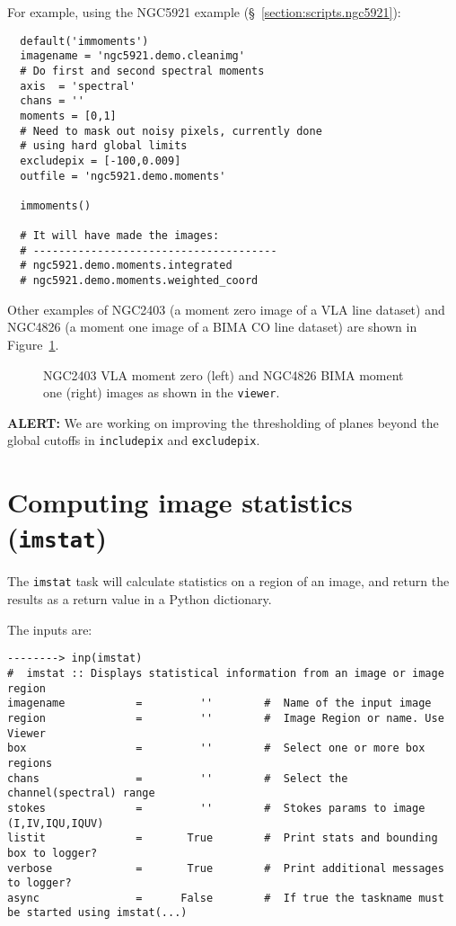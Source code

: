 For example, using the NGC5921 example (\S~\ref{section:scripts.ngc5921}):
\small
\begin{verbatim}
  default('immoments')
  imagename = 'ngc5921.demo.cleanimg'
  # Do first and second spectral moments
  axis  = 'spectral'
  chans = ''
  moments = [0,1]
  # Need to mask out noisy pixels, currently done
  # using hard global limits
  excludepix = [-100,0.009]
  outfile = 'ngc5921.demo.moments'
  
  immoments()
  
  # It will have made the images:
  # --------------------------------------
  # ngc5921.demo.moments.integrated
  # ngc5921.demo.moments.weighted_coord
\end{verbatim}
\normalsize

Other examples of NGC2403 (a moment zero image of a VLA line dataset)
and NGC4826 (a moment one image of a BIMA CO line dataset) are
shown in Figure~\ref{fig:n2403momzero}.

\begin{figure}[h!]
\begin{center}
\caption{\label{fig:n2403momzero} NGC2403 VLA moment zero (left) and
NGC4826 BIMA moment one (right) images as shown in the {\tt viewer}.}
\hrulefill
\end{center}
\end{figure}

{\bf ALERT:} We are working on improving the thresholding
of planes beyond the global cutoffs in {\tt includepix}
and {\tt excludepix}.

\section{Computing image statistics ({\tt imstat})}
\label{section:analysis.imstat}

The {\tt imstat} task will calculate statistics on a region of
an image, and return the results as a return value in a Python
dictionary.

The inputs are:
\small
\begin{verbatim}
--------> inp(imstat)
#  imstat :: Displays statistical information from an image or image region
imagename           =         ''        #  Name of the input image
region              =         ''        #  Image Region or name. Use Viewer
box                 =         ''        #  Select one or more box regions
chans               =         ''        #  Select the channel(spectral) range
stokes              =         ''        #  Stokes params to image (I,IV,IQU,IQUV)
listit              =       True        #  Print stats and bounding box to logger?
verbose             =       True        #  Print additional messages to logger?
async               =      False        #  If true the taskname must be started using imstat(...)
\end{verbatim}
\normalsize

